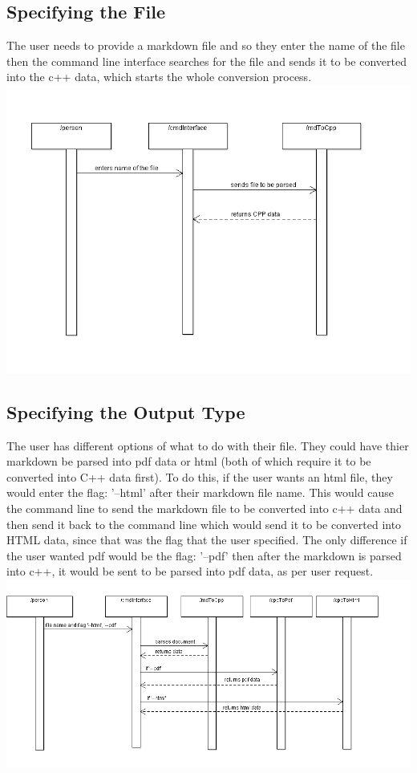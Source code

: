 \subsection{Specifying the File}
The user needs to provide a markdown file and so they enter the name of the file then the command line interface searches for the file and sends it to be converted into the c++ data, which starts the whole conversion process.
\hspace{-2cm}\includegraphics[width=500pt]{images/SpecifyingFile.png}

\subsection{Specifying the Output Type}
The user has different options of what to do with their file. They could have thier markdown be parsed into pdf data or html (both of which require it to be converted into C++ data first). To do this, if the user wants an html file, they would enter the flag: '--html' after their markdown file name. This would cause the command line to send the markdown file to be converted into c++ data and then send it back to the command line which would send it to be converted into HTML data, since that was the flag that the user specified. The only difference if the user wanted pdf would be the flag: '--pdf' then after the markdown is parsed into c++, it would be sent to be parsed into pdf data, as per user request.
\hspace{-3cm}\includegraphics[width=550pt]{images/SpecifyingOutputFile.png}

